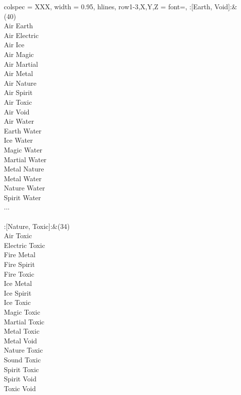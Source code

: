 \begin{longtblr}[
	caption = {2v2 Attacking Ineffective},
	label = {2v2-Attacking-Ineffective},
]{
	colspec = {XXX}, width = 0.95\linewidth,
	hlines,
	row{1-3,X,Y,Z} = {font=\bfseries},
}
	:[Earth, Void]:&{(40)\\
	Air Earth \\
	Air Electric \\
	Air Ice \\
	Air Magic \\
	Air Martial \\
	Air Metal \\
	Air Nature \\
	Air Spirit \\
	Air Toxic \\
	Air Void \\
	Air Water \\
	Earth Water \\
	Ice Water \\
	Magic Water \\
	Martial Water \\
	Metal Nature \\
	Metal Water \\
	Nature Water \\
	Spirit Water \\
	...\\
	}\\

	:[Nature, Toxic]:&{(34)\\
	Air Toxic \\
	Electric Toxic \\
	Fire Metal \\
	Fire Spirit \\
	Fire Toxic \\
	Ice Metal \\
	Ice Spirit \\
	Ice Toxic \\
	Magic Toxic \\
	Martial Toxic \\
	Metal Toxic \\
	Metal Void \\
	Nature Toxic \\
	Sound Toxic \\
	Spirit Toxic \\
	Spirit Void \\
	Toxic Void \\
	}\\


\end{longtblr}
